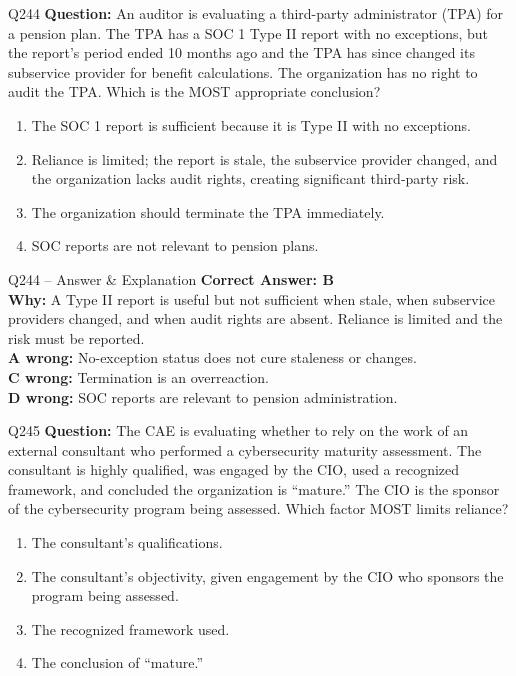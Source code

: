 \documentclass[aspectratio=169,10pt]{beamer}
\begin{document}
	\begin{frame}[t]{Q244}
		\small
		\textbf{Question:} An auditor is evaluating a third-party administrator (TPA) for a pension plan. The TPA has a SOC 1 Type II report with no exceptions, but the report's period ended 10 months ago and the TPA has since changed its subservice provider for benefit calculations. The organization has no right to audit the TPA. Which is the MOST appropriate conclusion?
		\begin{enumerate}[label=\Alph*.,itemsep=1pt,topsep=2pt]
			\item The SOC 1 report is sufficient because it is Type II with no exceptions.
			\item Reliance is limited; the report is stale, the subservice provider changed, and the organization lacks audit rights, creating significant third-party risk.
			\item The organization should terminate the TPA immediately.
			\item SOC reports are not relevant to pension plans.
		\end{enumerate}
	\end{frame}
	
	\begin{frame}[t]{Q244 -- Answer \& Explanation}
		\small
		\textbf{Correct Answer: B} \\[4pt]
		\textbf{Why:} A Type II report is useful but not sufficient when stale, when subservice providers changed, and when audit rights are absent. Reliance is limited and the risk must be reported. \\[4pt]
		\textbf{A wrong:} No-exception status does not cure staleness or changes. \\[2pt]
		\textbf{C wrong:} Termination is an overreaction. \\[2pt]
		\textbf{D wrong:} SOC reports are relevant to pension administration.
	\end{frame}
	
	\begin{frame}[t]{Q245}
		\small
		\textbf{Question:} The CAE is evaluating whether to rely on the work of an external consultant who performed a cybersecurity maturity assessment. The consultant is highly qualified, was engaged by the CIO, used a recognized framework, and concluded the organization is ``mature.'' The CIO is the sponsor of the cybersecurity program being assessed. Which factor MOST limits reliance?
		\begin{enumerate}[label=\Alph*.,itemsep=1pt,topsep=2pt]
			\item The consultant's qualifications.
			\item The consultant's objectivity, given engagement by the CIO who sponsors the program being assessed.
			\item The recognized framework used.
			\item The conclusion of ``mature.''
		\end{enumerate}
	\end{frame}
	
\end{document}
